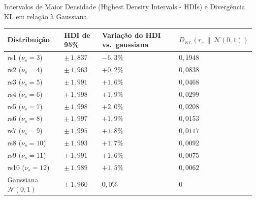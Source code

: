 \documentclass[11pt]{article}
\newcounter{none}
\begin{document}
Intervalos de Maior Densidade (Highest Density Intervals - HDIs) e
Divergência KL em relação à Gaussiana.

{\def\LTcaptype{none} %
\begin{longtable}[]{@{}
  >{\raggedright\arraybackslash}p{}
  >{\raggedright\arraybackslash}p{}
  >{\raggedright\arraybackslash}p{}
  >{\raggedright\arraybackslash}p{}@{}}
\toprule\noalign{}
\begin{minipage}[b]{\linewidth}\raggedright
Distribuição
\end{minipage} & \begin{minipage}[b]{\linewidth}\raggedright
HDI de 95\%
\end{minipage} & \begin{minipage}[b]{\linewidth}\raggedright
Variação do HDI vs.~gaussiana
\end{minipage} & \begin{minipage}[b]{\linewidth}\raggedright
\(D_{KL}(r_s \,\|\, \mathcal{N}(0,1))\)
\end{minipage} \\
\midrule\noalign{}
\endhead
\bottomrule\noalign{}
\endlastfoot
rs1 (\(\nu_s=3\)) & \(\pm\,1{,}837\) & \(-6{,}3\%\) & \(0{,}1948\) \\
rs2 (\(\nu_s=4\)) & \(\pm\,1{,}963\) & \(+0{,}2\%\) & \(0{,}0838\) \\
rs3 (\(\nu_s=5\)) & \(\pm\,1{,}991\) & \(+1{,}6\%\) & \(0{,}0468\) \\
rs4 (\(\nu_s=6\)) & \(\pm\,1{,}998\) & \(+1{,}9\%\) & \(0{,}0299\) \\
rs5 (\(\nu_s=7\)) & \(\pm\,1{,}998\) & \(+2{,}0\%\) & \(0{,}0208\) \\
rs6 (\(\nu_s=8\)) & \(\pm\,1{,}997\) & \(+1{,}9\%\) & \(0{,}0153\) \\
rs7 (\(\nu_s=9\)) & \(\pm\,1{,}995\) & \(+1{,}8\%\) & \(0{,}0117\) \\
rs8 (\(\nu_s=10\)) & \(\pm\,1{,}993\) & \(+1{,}7\%\) & \(0{,}0092\) \\
rs9 (\(\nu_s=11\)) & \(\pm\,1{,}991\) & \(+1{,}6\%\) & \(0{,}0075\) \\
rs10 (\(\nu_s=12\)) & \(\pm\,1{,}989\) & \(+1{,}5\%\) & \(0{,}0062\) \\
Gaussiana \(\mathcal{N}(0,1)\) & \(\pm\,1{,}960\) & \(0{,}0\%\) &
\(0\) \\
\end{longtable}
}
\end{document}

